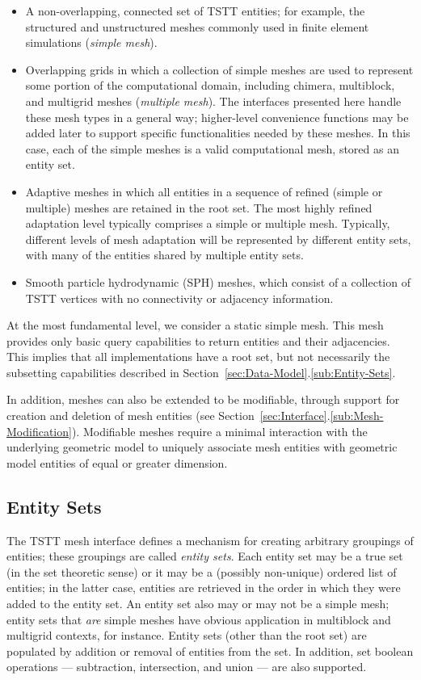 \begin{itemize}
\item A non-overlapping, connected set of TSTT entities; for example,
the structured and unstructured meshes commonly used in finite element
simulations (\emph{simple mesh}).  
\item Overlapping grids in which a collection of simple meshes are used
to represent some portion of the computational domain, including
chimera, multiblock, and multigrid meshes (\emph{multiple mesh}). The
interfaces presented here handle these mesh types in a general way;
higher-level convenience functions may be added later to support
specific functionalities needed by these meshes. In this case, each of
the simple meshes is a valid computational mesh, stored as an entity
set.
\item Adaptive meshes in which all entities in a sequence of refined (simple or multiple)
meshes are retained in the root set. The most highly refined adaptation
level typically comprises a simple or multiple mesh. Typically,
different levels of mesh adaptation will be represented by different entity
sets, with many of the entities shared by multiple entity sets.
\item Smooth particle hydrodynamic (SPH) meshes, which consist of a collection
of TSTT vertices with no connectivity or adjacency information. 
\end{itemize}
At the most fundamental level, we consider a static simple mesh. This
mesh provides only basic query capabilities to return entities and their
adjacencies.  This implies that all implementations have a root set, but
not necessarily the subsetting capabilities described in
Section~\ref{sec:Data-Model}.\ref{sub:Entity-Sets}.

In addition, meshes can also be extended to be modifiable, through
support for creation and deletion of mesh entities (see
Section~\ref{sec:Interface}.\ref{sub:Mesh-Modification}).  Modifiable
meshes require a minimal interaction with the underlying geometric model
to uniquely associate mesh entities with geometric model entities of
equal or greater dimension\cite{geoclas}.


\subsection{Entity Sets\label{sub:Entity-Sets}}

The TSTT mesh interface defines a mechanism for creating arbitrary
groupings of entities; these groupings are called \emph{entity sets}.
Each entity set may be a true set (in the set theoretic sense) or it may be
a (possibly non-unique) ordered list of entities; in the latter case,
entities are retrieved in the order in which they were added to the
entity set. An entity set also may or may not be a simple mesh; entity
sets that \emph{are} simple meshes have obvious application in
multiblock and multigrid contexts, for instance. Entity sets (other than
the root set) are populated by addition or removal of entities from the
set. In addition, set boolean operations --- subtraction, intersection,
and union --- are also supported.

